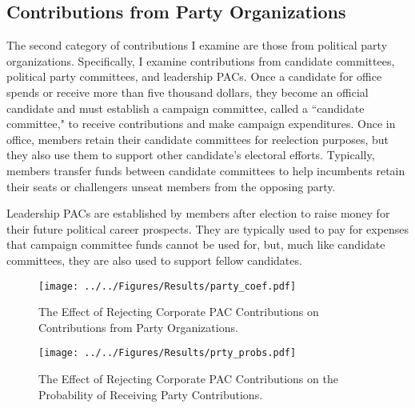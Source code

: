 \documentclass[12pt]{article}
\begin{document}
\subsection{Contributions from Party Organizations}

The second category of contributions I examine are those from political party organizations. Specifically, I examine contributions from candidate committees, political party committees, and leadership PACs. Once a candidate for office spends or receive more than five thousand dollars, they become an official candidate and must establish a campaign committee, called a ``candidate committee," to receive contributions and make campaign expenditures. Once in office, members retain their candidate committees for reelection purposes, but they also use them to support other candidate's electoral efforts. Typically, members transfer funds between candidate committees to help incumbents retain their seats or challengers unseat members from the opposing party. 

Leadership PACs are established by members after election to raise money for their future political career prospects. They are typically used to pay for expenses that campaign committee funds cannot be used for, but, much like candidate committees, they are also used to support fellow candidates. 

\begin{figure*}[!htb]
    \centering
    \begin{subfigure}[b]{0.65\textwidth}
        \centering
        \texttt{[image: ../../Figures/Results/party\_coef.pdf]}
        \caption{The Effect of Rejecting Corporate PAC Contributions on Contributions from Party Organizations.}
        \label{fig: party coefs}
    \end{subfigure}
    
    \begin{subfigure}[b]{0.65\textwidth}
        \centering
        \texttt{[image: ../../Figures/Results/prty\_probs.pdf]}
        \caption{The Effect of Rejecting Corporate PAC Contributions on the Probability of Receiving Party Contributions.}
        \label{fig: party probs}
    \end{subfigure}
    \caption{\textbf{The Effect of Rejecting Corporate PAC Contributions on Contributions and the Probability of Receiving Money from Political Parties.} These figures present the posterior distributions estimated for a candidate that pledges to reject corporate PAC contributions. The dot shows the median coefficient estimate and the intervals show the 50\% and 89\% highest density intervals. Figure \ref{fig: party coefs} shows that candidates that pledge to reject corporate PAC contributions experience a reduction in contributions from leadership PACs but also experience an increase in contributions from candidate committees. Figure \ref{fig: party probs} shows that rejecting corporate PAC contributions has no effect on the probability of receiving contributions from candidate committees, leadership PACs, or political parties. See Table \ref{tbl: party results} for the formal estimates.}
    \label{fig: party results}
\end{figure*}
\end{document}

